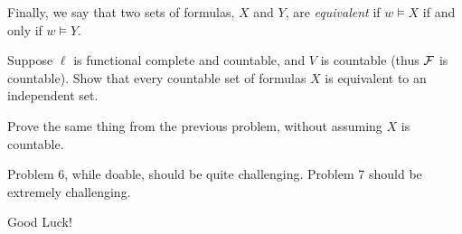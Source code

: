 Finally, we say that two sets of formulas, $X$ and $Y$, are {\it equivalent} if $w\vDash X$ if
and only if $w\vDash Y$.

\bprob

    Suppose $\ell$ is functional complete and countable, and $V$ is countable (thus ${\cal F}$ is
    countable).
    Show that every countable set of formulas $X$ is equivalent to an independent set.

\eprob

\bprob

    Prove the same thing from the previous problem, without assuming $X$ is countable.

\eprob

Problem 6, while doable, should be quite challenging.
Problem 7 should be extremely challenging.

\bigskip

\centerline{Good Luck!}

\bye

